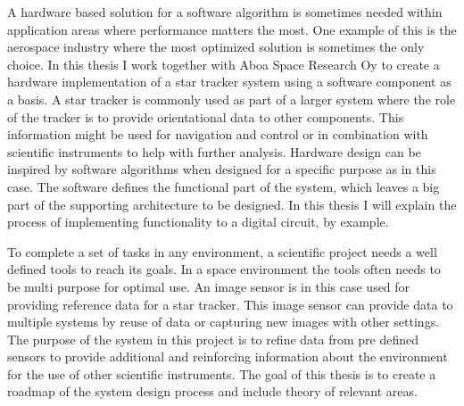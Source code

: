 \documentclass[12pt]{report}
\begin{document}
A hardware based solution for a software algorithm is sometimes needed within application areas where performance matters the most. One example of this is the aerospace industry where the most optimized solution is sometimes the only choice. In this thesis I work together with Aboa Space Research Oy to create a hardware implementation of a star tracker system using a software component as a basis. A star tracker is commonly used as part of a larger system where the role of the tracker is to provide orientational data to other components. This information might be used for navigation and control or in combination with scientific instruments to help with further analysis.
Hardware design can be inspired by software algorithms when designed for a specific purpose as in this case. The software defines the functional part of the system, which leaves a big part of the supporting architecture to be designed. In this thesis I will explain the process of implementing functionality to a digital circuit, by example.



\par

To complete a set of tasks in any environment, a scientific project needs a well defined tools to reach its goals. In a space environment the tools often needs to be multi purpose for optimal use. An image sensor is in this case used for providing reference data for a star tracker. This image sensor can provide data to multiple systems by reuse of data or capturing new images with other settings. The purpose of the system in this project is to refine data from pre defined sensors to provide additional and reinforcing information about the environment for the use of other scientific instruments. The goal of this thesis is to create a roadmap of the system design process and include theory of relevant areas.
\end{document}
